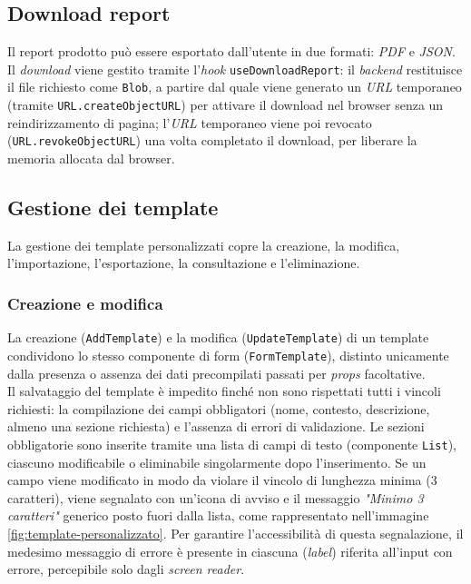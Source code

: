 \subsection{Download report}
Il report prodotto può essere esportato dall'utente in due formati: \emph{PDF} e \emph{JSON}. Il \emph{download} viene gestito tramite l'\emph{hook} \texttt{useDownloadReport}: il \emph{backend} restituisce il file richiesto come \texttt{Blob}, a partire dal quale viene generato un \emph{URL} temporaneo (tramite \texttt{URL.createObjectURL}) per attivare il download nel browser senza un reindirizzamento di pagina; l'\emph{URL} temporaneo viene poi revocato (\texttt{URL.revokeObjectURL}) una volta completato il download, per liberare la memoria allocata dal browser.

\subsection{Gestione dei template}
La gestione dei template personalizzati copre la creazione, la modifica, l'importazione, l'esportazione, la consultazione e l'eliminazione.

\subsubsection{Creazione e modifica}
La creazione (\texttt{AddTemplate}) e la modifica (\texttt{UpdateTemplate}) di un template condividono lo stesso componente di form (\texttt{FormTemplate}), distinto unicamente dalla presenza o assenza dei dati precompilati passati per \emph{props} facoltative.\\

Il salvataggio del template è impedito finché non sono rispettati tutti i vincoli richiesti: la compilazione dei campi obbligatori (nome, contesto, descrizione, almeno una sezione richiesta) e l'assenza di errori di validazione. Le sezioni obbligatorie sono inserite tramite una lista di campi di testo (componente \texttt{List}), ciascuno modificabile o eliminabile singolarmente dopo l'inserimento. Se un campo viene modificato in modo da violare il vincolo di lunghezza minima (3 caratteri), viene segnalato con un'icona di avviso e il messaggio \emph{"Minimo 3 caratteri"} generico posto fuori dalla lista, come rappresentato nell'immagine \ref{fig:template-personalizzato}. Per garantire l'accessibilità di questa segnalazione, il medesimo messaggio di errore è presente in ciascuna (\emph{label}) riferita all'input con errore, percepibile solo dagli \emph{screen reader}.

